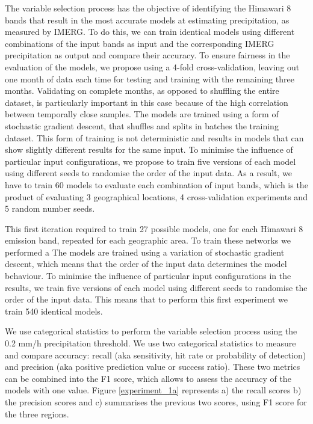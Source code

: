 \documentclass[3p,times]{elsarticle}
\begin{document}
The variable selection process has the objective of identifying the Himawari 8 bands that result in the most accurate models at estimating precipitation, as measured by IMERG. To do this, we can train identical models using different combinations of the input bands as input and the corresponding IMERG precipitation as output and compare their accuracy. To ensure fairness in the evaluation of the models, we propose using a 4-fold cross-validation, leaving out one month of data each time for testing and training with the remaining three months. Validating on complete months, as opposed to shuffling the entire dataset, is particularly important in this case because of the high correlation between temporally close samples. The models are trained using a form of stochastic gradient descent, that shuffles and splits in batches the training dataset. This form of training is not deterministic and results in models that can show slightly different results for the same input. To minimise the influence of particular input configurations, we propose to train five versions of each model using different seeds to randomise the order of the input data. As a result, we have to train 60 models to evaluate each combination of input bands,  which is the product of evaluating 3 geographical locations, 4 cross-validation experiments and 5 random number seeds.




This first iteration required to train 27 possible models, one for each Himawari 8 emission band, repeated for each geographic area. To train these networks we performed a  The models are trained using a variation of stochastic gradient descent, which means that the order of the input data determines the model behaviour. To minimise the influence of particular input configurations in the results, we train five versions of each model using different seeds to randomise the order of the input data. This means that to perform this first experiment we train 540 identical models. 

We use categorical statistics to perform the variable selection process using the 0.2 mm/h precipitation threshold. We use two categorical statistics to measure and compare accuracy: recall (aka sensitivity, hit rate or probability of detection) and precision (aka positive prediction value or success ratio). These two metrics can be combined into the F1 score, which allows to assess the accuracy of the models with one value. Figure \ref{experiment_1a} represents a) the recall scores b) the precision scores and c) summarises the previous two scores, using F1 score for the three regions.
\end{document}
